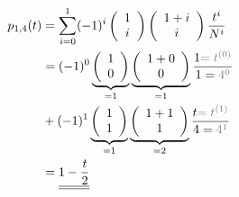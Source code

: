 $$
\begin{aligned}
p_{1, 4}(t)&=\sum_{i=0}^1(-1)^i\left(\begin{array}{c}
1 \\
i
\end{array}\right)\left(\begin{array}{c}
1+i \\
i
\end{array}\right) \frac{t^{i}}{N^{i}} \\
&=(-1)^0\underbrace{\left(\begin{array}{c}
1 \\
0
\end{array}\right)}_{=1}\underbrace{\left(\begin{array}{c}
1+0 \\
0
\end{array}\right)}_{=1} \frac{1\textcolor{gray}{=t^{(0)}}}{1=\textcolor{gray}{4^0}}\\&+
(-1)^1\underbrace{\left(\begin{array}{c}
1 \\
1
\end{array}\right)}_{=1}\underbrace{\left(\begin{array}{c}
1+1 \\
1
\end{array}\right)}_{=2} \frac{t\textcolor{gray}{=t^{(1)}}}{4=\textcolor{gray}{4^1}}\\ &=\underline{\underline{1-\frac{t}{2}}}
\end{aligned}
$$


